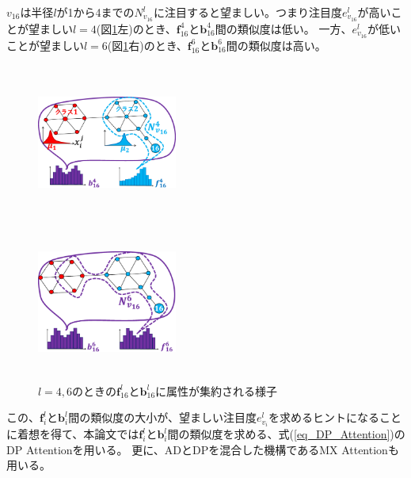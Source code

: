 \documentclass[a4j,twocolumn]{jsarticle}
\begin{document}
$v_{16}$は半径$l$が1から4までの$N_{v_{16}}^l$に注目すると望ましい。つまり注目度$e_{v_{16}}^l$が高いことが望ましい$l=4$(図\ref{fig_alpha}左)のとき、$\bm{f}_{16}^4$と$\bm{b}_{16}^4$間の類似度は低い。
一方、$e_{v_{16}}^l$が低いことが望ましい$l=6$(図\ref{fig_alpha}右)のとき、$\bm{f}_{16}^6$と$\bm{b}_{16}^6$間の類似度は高い。

\begin{figure}[b]
  \begin{minipage}{0.49\hsize}
   \begin{center}
    \includegraphics[height=52mm,width=46mm]{alpha_l4.eps}
   \end{center}
  \end{minipage}
  \begin{minipage}{0.49\hsize}
  \begin{center}
   \includegraphics[height=52mm,width=46mm]{alpha_l6.eps}
  \end{center}
  \end{minipage}
\vspace{-1mm}
\caption{$l=4,6$のときの$\bm{f}_{16}^l$と$\bm{b}_{16}^l$に属性が集約される様子}
\label{fig_alpha}
\end{figure}

この、$\bm{f}_i^l$と$\bm{b}_i^l$間の類似度の大小が、望ましい注目度$e_{v_i}^l$を求めるヒントになることに着想を得て、本論文では$\bm{f}_i^l$と$\bm{b}_i^l$間の類似度を求める、式(\ref{eq_DP_Attention})のDP Attentionを用いる。
更に、ADとDPを混合した機構であるMX Attention\cite{Kim}も用いる。
\end{document}
